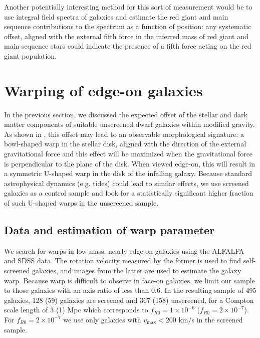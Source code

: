 \documentclass[useAMS,usenatbib,twocolumn]{mn2e}
\newcommand{\jakesays}[1]{{\color{red}[Jake says: #1]}}
\newcommand{\vinusays}[1]{{\color{blue}[Vinu says: #1]}}
\begin{document}
Another potentially interesting method 
for this sort of measurement would be to use integral field
spectra of galaxies and estimate the red giant and main sequence contributions
to the spectrum as a function of position: any systematic offset, aligned with
the external fifth force in the inferred mass of red giant and main sequence
stars could indicate the presence of a fifth force acting on the red giant
population.




\section{Warping of edge-on galaxies}
\label{sec:warp}

In the previous section, we discussed the expected offset of the stellar
and dark matter components of suitable unscreened dwarf galaxies within
modified gravity.  As shown in \citet{bhuvjake2011}, this offset may lead
to an observable morphological signature: a bowl-shaped warp in the stellar
disk, aligned with the direction of the external gravitational force and this
effect will be maximized when the gravitational
force is perpendicular to the plane of the disk. When viewed edge-on,
this will result in a symmetric U-shaped warp in the disk of the infalling
galaxy.  Because standard astrophysical dynamics (e.g. tides) could lead to
similar effects, we use screened galaxies as a control sample and look for
a statistically significant higher fraction of such U-shaped warps in the
unscreened sample.

\subsection{Data and estimation of warp parameter}
We search for warps in low mass, nearly edge-on galaxies using the
ALFALFA and SDSS data. The rotation velocity measured by the former is used to
find self-screened galaxies, and images from the latter are
used to estimate the galaxy warp.
Because warp is difficult to observe in face-on
galaxies, we limit our sample to those galaxies with an axis ratio
of less than 0.6. In the resulting sample of 495 galaxies, 128 (59) 
galaxies are screened and 367 (158) unscreened, for a Compton scale length of 3
(1) Mpc which corresponds to $f_{R0}=1 \times 10^{-6}$ ($f_{R0}=2 \times
10^{-7}$). For $f_{R0}=2 \times 10^{-7}$ we use only galaxies with
$v_\mathrm{max} < 200$ km/s in the screened sample.
\end{document}
